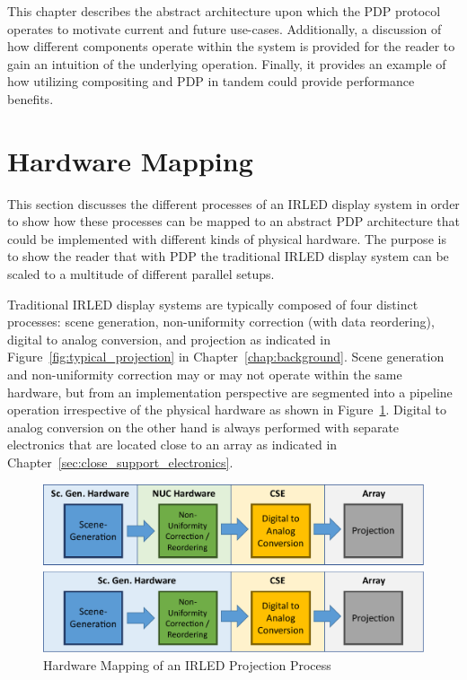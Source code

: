 \label{chap:machine_model}
This chapter describes the abstract architecture upon which the PDP protocol operates to motivate current and future use-cases. Additionally, a discussion of how different components operate within the system is provided for the reader to gain an intuition of the underlying operation. Finally, it provides an example of how utilizing compositing and PDP in tandem could provide performance benefits.

\section{Hardware Mapping}
    This section discusses the different processes of an IRLED display system in order to show how these processes can be mapped to an abstract PDP architecture that could be implemented with different kinds of physical hardware. The purpose is to show the reader that with PDP the traditional IRLED display system can be scaled to a multitude of different parallel setups.

    Traditional IRLED display systems are typically composed of four distinct processes: scene generation, non-uniformity correction (with data reordering), digital to analog conversion, and projection as indicated in Figure~\ref{fig:typical_projection} in Chapter~\ref{chap:background}. Scene generation and non-uniformity correction may or may not operate within the same hardware, but from an implementation perspective are segmented into a pipeline operation irrespective of the physical hardware as shown in Figure~\ref{fig:typical_projection_hardware}. Digital to analog conversion on the other hand is always performed with separate electronics that are located close to an array as indicated in Chapter~\ref{sec:close_support_electronics}.

    \begin{figure}
        \centering
        \includegraphics[width=1.0\textwidth]{fig/typical_projection_system_hardware.pdf}
        \caption{Hardware Mapping of an IRLED Projection Process}
        \label{fig:typical_projection_hardware}
    \end{figure}

